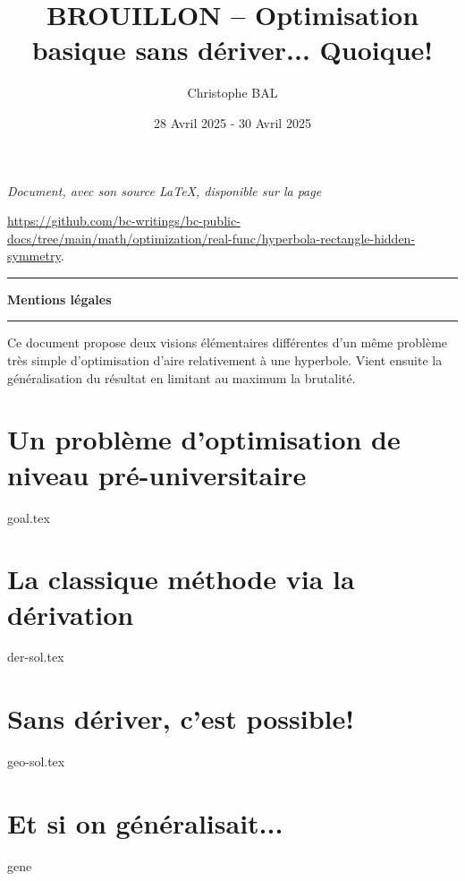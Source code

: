 \documentclass[12pt]{amsart}
\begin{document}
\title{BROUILLON -- Optimisation basique sans dériver... Quoique!}
\author{Christophe BAL}
\date{28 Avril 2025 - 30 Avril 2025}

\maketitle

\begin{center}
	\itshape
	Document, avec son source \LaTeX, disponible sur la page

	\url{https://github.com/bc-writings/bc-public-docs/tree/main/math/optimization/real-func/hyperbola-rectangle-hidden-symmetry}.
\end{center}


\bigskip


\begin{center}
	\hrule\vspace{.3em}
	{
		\fontsize{1.35em}{1em}\selectfont
		\textbf{Mentions \og légales \fg}
	}

	\vspace{0.45em}
	\doclicenseThis
	\hrule
\end{center}


\bigskip


\setcounter{tocdepth}{2}
\tableofcontents




\newpage

\begin{meta-abstract*}
	Ce document propose deux visions élémentaires différentes d'un même problème très simple d'optimisation d'aire relativement à une hyperbole.
	Vient ensuite la généralisation du résultat en limitant au maximum la brutalité.
\end{meta-abstract*}




\section{Un problème d'optimisation de niveau pré-universitaire}

{goal.tex}





\section{La classique méthode via la dérivation}

{der-sol.tex}




\section{Sans dériver, c'est possible!} \label{exa-geo}

{geo-sol.tex}




\section{Et si on généralisait...}

{gene}
	
\end{document}

